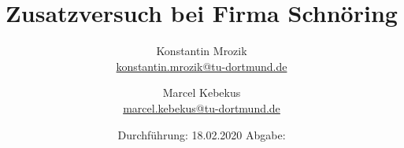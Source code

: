 

\title{Zusatzversuch bei Firma Schnöring}
\author{%
  Konstantin Mrozik\\%
  \href{mailto:konstantin.mrozik@tu-dortmund.de}{konstantin.mrozik@tu-dortmund.de}%
  \and%
  Marcel Kebekus\\%
  \href{mailto:marcel.kebekus@tu-dortmund.de}{marcel.kebekus@tu-dortmund.de}%
}
\date{%
  Durchführung: 18.02.2020
  \hspace{3em}
  Abgabe: 
}
\publishers{TU Dortmund – Fakultät Physik}
\makeatletter         
\def\@maketitle{
\raggedright
\texttt{[image: bilder/lo\_TU-Do 2008/logo\_rgb\_jpg]}\\[8ex]
\begin{center}
{\Huge \bfseries \sffamily \@title }\\[4ex] 
{\Large  \@author}\\[4ex] 
\@date\\[8ex]
\publishers\\
\end{center}}
\makeatother





\maketitle
\thispagestyle{empty}
\tableofcontents
\newpage





\newpage




